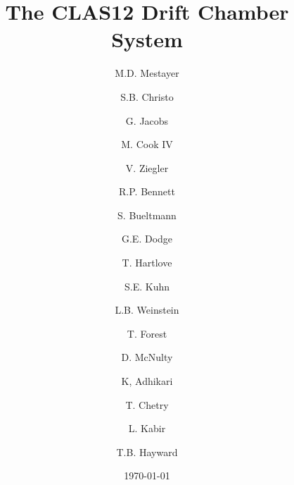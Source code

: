 \documentclass{elsart}
\begin{document}
\begin{frontmatter}
  
\title{The CLAS12 Drift Chamber System}


\author[jlab]{M.D. Mestayer}
\author[jlab]{S.B. Christo}
\author[jlab]{G. Jacobs}
\author[jlab]{M. Cook IV}
\author[jlab]{V. Ziegler}
\author[odu]{R.P. Bennett}
\author[odu]{S. Bueltmann}
\author[odu]{G.E. Dodge}
\author[odu]{T. Hartlove}
\author[odu]{S.E. Kuhn}
\author[odu]{L.B. Weinstein}
\author[isu]{T. Forest}
\author[isu]{D. McNulty}
\author[msu]{K, Adhikari}
\author[msu]{T. Chetry}
\author[msu]{L. Kabir}
\author[wm]{T.B. Hayward}
\address[jlab]{Thomas Jefferson National Accelerator Facility, Newport News, VA 23606, USA}
\address[odu]{Old Dominion University}
\address[isu]{Idaho State University}
\address[msu]{Mississippi State University}
\address[wm]{University of William and Mary}

\date{\today}





\end{frontmatter}















\end{document}
